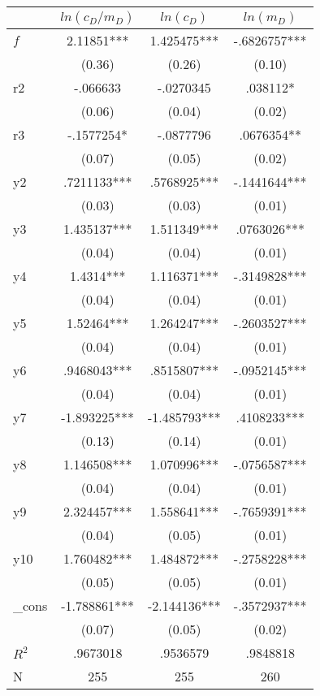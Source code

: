 \begin{tabular}{lccc}
            &   $ln(c_D/m_D)$   &   $ln(c_D)$   &     $ln(m_D)$   \\
\hline
$f$         &     2.11851***&    1.425475***&   -.6826757***\\
            &      (0.36)   &      (0.26)   &      (0.10)   \\
r2          &    -.066633   &   -.0270345   &     .038112*  \\
            &      (0.06)   &      (0.04)   &      (0.02)   \\
r3          &   -.1577254*  &   -.0877796   &    .0676354** \\
            &      (0.07)   &      (0.05)   &      (0.02)   \\
y2          &    .7211133***&    .5768925***&   -.1441644***\\
            &      (0.03)   &      (0.03)   &      (0.01)   \\
y3          &    1.435137***&    1.511349***&    .0763026***\\
            &      (0.04)   &      (0.04)   &      (0.01)   \\
y4          &      1.4314***&    1.116371***&   -.3149828***\\
            &      (0.04)   &      (0.04)   &      (0.01)   \\
y5          &     1.52464***&    1.264247***&   -.2603527***\\
            &      (0.04)   &      (0.04)   &      (0.01)   \\
y6          &    .9468043***&    .8515807***&   -.0952145***\\
            &      (0.04)   &      (0.04)   &      (0.01)   \\
y7          &   -1.893225***&   -1.485793***&    .4108233***\\
            &      (0.13)   &      (0.14)   &      (0.01)   \\
y8          &    1.146508***&    1.070996***&   -.0756587***\\
            &      (0.04)   &      (0.04)   &      (0.01)   \\
y9          &    2.324457***&    1.558641***&   -.7659391***\\
            &      (0.04)   &      (0.05)   &      (0.01)   \\
y10         &    1.760482***&    1.484872***&   -.2758228***\\
            &      (0.05)   &      (0.05)   &      (0.01)   \\
\_cons      &   -1.788861***&   -2.144136***&   -.3572937***\\
            &      (0.07)   &      (0.05)   &      (0.02)   \\
$R^2$       &    .9673018   &    .9536579   &    .9848818   \\
N           &         255   &         255   &         260   \\
\end{tabular}